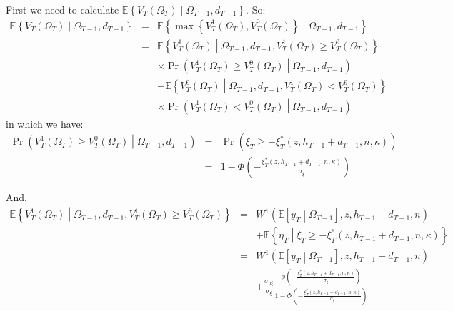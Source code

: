 \noindent First we need to calculate $\mathbb{E} \left\{ V_T\left(\Omega_T\right) \middle| \Omega_{T-1}, d_{T-1}\right\}$. So:
\begin{eqnarray*}
\mathbb{E} \left\{ V_T\left(\Omega_T\right) \middle| \Omega_{T-1}, d_{T-1}\right\} &=& \mathbb{E} \left\{ \max\left\{ V^{1}_T\left(\Omega_T\right), V^{0}_T\left(\Omega_T\right) \right\} \middle| \Omega_{T-1}, d_{T-1} \right\} \\
&=& \mathbb{E} \left\{ V^{1}_T\left(\Omega_T\right) \middle| \Omega_{T-1}, d_{T-1}, V^{1}_T\left(\Omega_T\right) \geq V^{0}_T\left(\Omega_T\right) \right\} \\
& & \times \Pr\left(V^1_T\left(\Omega_T\right) \geq V^0_T\left(\Omega_T\right) \middle| \Omega_{T-1}, d_{T-1} \right)\\
& & + \mathbb{E} \left\{ V^{0}_T\left(\Omega_T\right) \middle| \Omega_{T-1}, d_{T-1}, V^{1}_T\left(\Omega_T\right) < V^{0}_T\left(\Omega_T\right) \right\} \\
& & \times \Pr\left(V^1_T\left(\Omega_T\right) < V^0_T\left(\Omega_T\right) \middle| \Omega_{T-1}, d_{T-1} \right)
\end{eqnarray*}
in which we have:
\begin{eqnarray*}
\Pr\left(V^1_T\left(\Omega_T\right) \geq V^0_T\left(\Omega_T\right) \middle| \Omega_{T-1}, d_{T-1} \right) &=& \Pr\left(\xi_T \geq - \xi^*_T\left(z, h_{T-1}+d_{T-1},n,\kappa\right)\right)\\
&=& 1 - \Phi\left( -\frac{\xi^*_T\left(z,h_{T-1}+d_{T-1},n,\kappa\right)}{\sigma_\xi}\right)
\end{eqnarray*}

\noindent And,
\begin{eqnarray*}
\mathbb{E} \left\{ V^{1}_T\left(\Omega_T\right) \middle| \Omega_{T-1}, d_{T-1}, V^{1}_T\left(\Omega_T\right) \geq V^{0}_T\left(\Omega_T\right) \right\} &=& W^1\left(\mathbb{E} [y_T \middle| \Omega_{T-1}],z,h_{T-1}+d_{T-1},n\right) \\
& & + \mathbb{E} \left\{\eta_T \middle| \xi_T \geq - \xi^*_T\left( z, h_{T-1}+d_{T-1}, n, \kappa\right)\right\} \\
&=& W^1\left(\mathbb{E} [y_T \middle| \Omega_{T-1}],z,h_{T-1}+d_{T-1},n\right) \\
& & +  \frac{\sigma_{\eta \xi}}{\sigma_\xi} \frac{\phi\left(-\frac{\xi^*_T\left(z,h_{T-1}+d_{T-1},n,\kappa\right)}{\sigma_\xi}\right)}{1-\Phi\left(-\frac{\xi^*_T\left(z,h_{T-1}+d_{T-1},n,\kappa\right)}{\sigma_\xi}\right)}
\end{eqnarray*}

